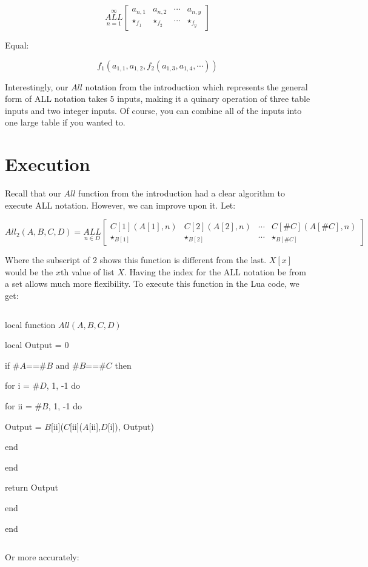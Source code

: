 \documentclass{article}
\begin{document}
$$\underset{n=1}{\overset{\infty}{ALL}} \begin{bmatrix}
a_{n,1} & a_{n,2} & \cdots & a_{n,y} \\
\star_{f_1} & \star_{f_2} & \cdots & \star_{f_y}
\end{bmatrix}$$

Equal:

$$f_1(a_{1,1},a_{1,2},f_2(a_{1,3},a_{1,4},\cdots))$$

Interestingly, our $All$ notation from the introduction which represents the general form of ALL notation takes 5 inputs, making it a quinary operation of three table inputs and two integer inputs. Of course, you can combine all of the inputs into one large table if you wanted to.

\section{Execution}

Recall that our $All$ function from the introduction had a clear algorithm to execute ALL notation. However, we can improve upon it. Let:

$$All_2(A, B, C, D)=\underset{n \in D}{ALL} \begin{bmatrix}
C[1](A[1],n) & C[2](A[2],n) & \cdots & C[\#C](A[\#C],n) \\
\star_{B[1]}& \star_{B[2]} & \cdots & \star_{B[\#C]}
\end{bmatrix}$$

Where the subscript of 2 shows this function is different from the last. $X[x]$ would be the $x$th value of list $X$. Having the index for the ALL notation be from a set allows much more flexibility. To execute this function in the Lua code, we get:

$${}$$

local function $All(A, B, C, D)$

local Output = 0

if $\#A$==$\#B$ and $\#B$==$\#C$ then

for i = $\#D$, 1, -1 do

for ii = $\#B$, 1, -1 do

Output = $B$[ii]($C$[ii]($A$[ii],$D$[i]), Output)

end

end

return Output

end

end

$${}$$

Or more accurately:
\end{document}
